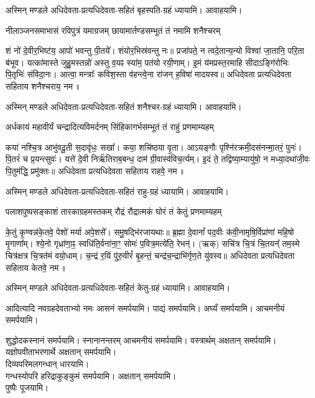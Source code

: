 अस्मिन् मण्डले अधिदेवता-प्रत्यधिदेवता-सहितं बृहस्पति-ग्रहं ध्यायामि। आवाहयामि।

\twolineshloka
{नीलाञ्जनसमाभासं रविपुत्रं यमाग्रजम्}
{छायामार्तण्डसम्भूतं तं नमामि शनैश्चरम्}

शं नो॑ दे॒वीर॒भिष्ट॑य॒ आपो॑ भवन्तु पी॒तये᳚। शंयोर॒भिस्र॑वन्तु नः॥ प्रजा॑पते॒ न त्वदे॒तान्य॒न्यो
विश्वा॑ जा॒तानि॒ परि॒ता ब॑भूव। यत्का॑मास्ते जुहु॒मस्तन्नो॑ अस्तु व॒यꣴ स्या॑म॒ पत॑यो रयी॒णाम्। इ॒मं
य॑मप्रस्त॒रमाहि सीदाऽङ्गि॑रोभिः पि॒तृभिः॑ संविदा॒नः। आत्वा॒ मन्त्राः᳚ कविश॒स्ता व॑हन्त्वे॒ना रा॑जन्
ह॒विषा॑ मादयस्व॥  अधिदेवता प्रत्यधिदेवता सहिताय शनैश्चराय॒ नम॥ 

अस्मिन् मण्डले अधिदेवता-प्रत्यधिदेवता-सहितं शनैश्चर-ग्रहं ध्यायामि। आवाहयामि।

\twolineshloka
{अर्धकायं महावीर्यं चन्द्रादित्यविमर्दनम्}
{सिंहिकागर्भसम्भूतं तं राहुं प्रणमाम्यहम्}

कया॑ नश्चि॒त्र आभु॑वदू॒ती स॒दावृ॑धः॒ सखा᳚। कया॒ शचि॑ष्ठया वृ॒ता। आऽयङ्गौः
पृश्नि॑रक्रमी॒दस॑नन्मा॒तरं॒ पुनः॑। पि॒तरं॑ च प्र॒यन्त्सुवः॑। यत्ते॑ दे॒वी निर्ऋ॑तिराब॒बन्ध॒ दाम॑
ग्री॒वास्व॑विच॒र्त्यम्। इ॒दं  ते॒ तद्विष्या॒म्यायु॑षो॒ न मध्या॒दथा॑जी॒वः पि॒तुम॑द्धि॒ प्रमु॑क्तः॥ 
अधिदेवता प्रत्यधिदेवता सहिताय राहवे॒ नम॥ 

अस्मिन् मण्डले अधिदेवता-प्रत्यधिदेवता-सहितं राहु-ग्रहं ध्यायामि। आवाहयामि।

\twolineshloka
{पलाशपुष्पसङ्काशं तारकाग्रहमस्तकम्}
{रौद्रं रौद्रात्मकं घोरं तं केतुं प्रणमाम्यहम्}

के॒तुं कृ॒ण्वन्न॑के॒तवे॒ पेशो॑ मर्या अपे॒शसे᳚। समु॒षद्भि॑रजायथाः॥ ब्र॒ह्मा दे॒वानां᳚ पद॒वीः
क॑वी॒नामृषि॒र्विप्रा॑णां महि॒षो मृ॒गाणा᳚म्। श्ये॒नो गृध्रा॑णा॒ꣴ॒ स्वधि॑ति॒र्वना॑ना॒ꣳ॒ सोमः॑
प॒वित्र॒मत्ये॑ति॒ रेभन्॑। (ऋक्) सचि॑त्र चि॒त्रं चि॒तयन्᳚ तम॒स्मे चित्र॑क्षत्र चि॒त्रत॑मं वयो॒धाम्।
च॒न्द्रं र॒यिं पु॑रु॒वीरं᳚ बृ॒हन्तं॒ चन्द्र॑च॒न्द्राभि॑र्गृण॒ते यु॑वस्व॥  अधिदेवता प्रत्यधिदेवता
सहिताय केतवे॒ नम॥ 

अस्मिन् मण्डले अधिदेवता-प्रत्यधिदेवता-सहितं केतु-ग्रहं ध्यायामि। आवाहयामि।

आदित्यादि नवग्रहदेवताभ्यो नमः आसनं समर्पयामि।
पाद्यं समर्पयामि। अर्घ्यं समर्पयामि। आचमनीयं समर्पयामि। 

शुद्धोदकस्नानं समर्पयामि। स्नानानन्तरम् आचमनीयं समर्पयामि।
वस्त्रार्थम् अक्षतान् समर्पयामि।\\
यज्ञोपवीताभरणार्थे अक्षतान् समर्पयामि।\\
दिव्यपरिमलगन्धान् धारयामि।\\
गन्धस्योपरि हरिद्राकुङ्कुमं समर्पयामि। अक्षतान् समर्पयामि। \\
पुष्पैः पूजयामि।

